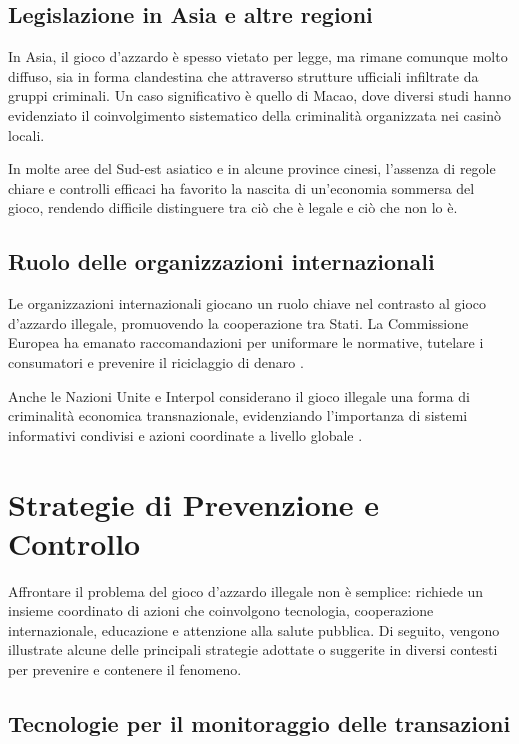 \documentclass[a4paper,12pt]{article}
\begin{document}
\subsection{Legislazione in Asia e altre regioni}

In Asia, il gioco d’azzardo è spesso vietato per legge, ma rimane comunque molto diffuso, sia in forma clandestina che attraverso strutture ufficiali infiltrate da gruppi criminali. Un caso significativo è quello di Macao, dove diversi studi hanno evidenziato il coinvolgimento sistematico della criminalità organizzata nei casinò locali.

In molte aree del Sud-est asiatico e in alcune province cinesi, l’assenza di regole chiare e controlli efficaci ha favorito la nascita di un’economia sommersa del gioco, rendendo difficile distinguere tra ciò che è legale e ciò che non lo è.

\subsection{Ruolo delle organizzazioni internazionali}

Le organizzazioni internazionali giocano un ruolo chiave nel contrasto al gioco d’azzardo illegale, promuovendo la cooperazione tra Stati. La Commissione Europea ha emanato raccomandazioni per uniformare le normative, tutelare i consumatori e prevenire il riciclaggio di denaro \cite{lucchini2022socialcosts}.

Anche le Nazioni Unite e Interpol considerano il gioco illegale una forma di criminalità economica transnazionale, evidenziando l'importanza di sistemi informativi condivisi e azioni coordinate a livello globale \cite{banks2018taxonomy}.


\section{Strategie di Prevenzione e Controllo}

Affrontare il problema del gioco d’azzardo illegale non è semplice: richiede un insieme coordinato di azioni che coinvolgono tecnologia, cooperazione internazionale, educazione e attenzione alla salute pubblica. Di seguito, vengono illustrate alcune delle principali strategie adottate o suggerite in diversi contesti per prevenire e contenere il fenomeno.

\subsection{Tecnologie per il monitoraggio delle transazioni}
\end{document}
